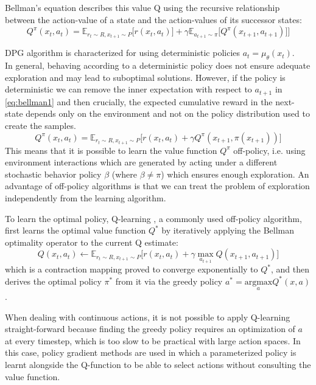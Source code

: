 Bellman's equation describes this value Q using the 
recursive relationship between the action-value of a state and the action-values of its
successor states:
\begin{equation}
    Q^\pi(x_t,a_t) = \mathbb E_{r_t\sim R,x_{t+1} \sim P}\Big[ r(x_t,a_t)] + \gamma \mathbb E_{a_{t+1}\sim \pi}\big[Q^\pi(x_{t+1},a_{t+1})\big]\Big] \label{eq:bellman1}
\end{equation}

DPG algorithm \citep{silver2014b} is characterized for using deterministic policies $a_t=\mu_{\theta}(x_t)$.\\
In general, behaving according to a deterministic policy does not ensure adequate exploration
and may lead to suboptimal solutions. 
However, if the policy is deterministic we can remove the inner expectation with respect 
to $a_{t+1}$ in \ref{eq:bellman1} and then crucially, the expected cumulative reward in the next-state 
depends only on the environment and not on the policy distribution used to create the samples.
\begin{equation}
    Q^\pi(x_t,a_t) = \mathbb E_{r_t \sim R,x_{t+1} \sim P}\Big[ r(x_t,a_t) + \gamma Q^\pi(x_{t+1},\pi(x_{t+1}))\Big]
\end{equation}
\label{par:offpolicy}
This means that it is possible to learn the value function
$Q^\pi$ off-policy, i.e. using environment interactions which are generated by acting
under a different stochastic
behavior policy $\beta$ (where $\beta \neq \pi$) which ensures enough exploration.
An advantage of off-policy algorithms is that we can treat the problem of exploration
independently from the learning algorithm.

To learn the optimal policy, Q-learning \cite{Watkins1992}, a commonly used off-policy algorithm, first learns the optimal 
value function $Q^*$ by iteratively applying the Bellman optimality operator to the current Q estimate:
\begin{equation}
    Q(x_t,a_t) \leftarrow \mathbb E_{r_t \sim R,x_{t+1} \sim P}\Big[ r(x_t,a_t) + \gamma \underset{a_{t+1}} \max Q(x_{t+1},a_{t+1})\Big]
\end{equation}
which is a contraction mapping proved to converge exponentially to $Q^*$, and then
derives the optimal policy $\pi^*$ from it via the greedy policy $a^*=\underset{a}{\text{argmax}} Q^*(x,a)$.

When dealing with continuous actions, it is not possible to apply Q-learning
straight-forward because finding the greedy policy requires an optimization of $a$ at 
every timestep, which is too slow to be practical with large action spaces.
In this case, policy gradient methods are used in which a parameterized policy is learnt 
alongside the Q-function to be able to select actions without consulting the value function.

